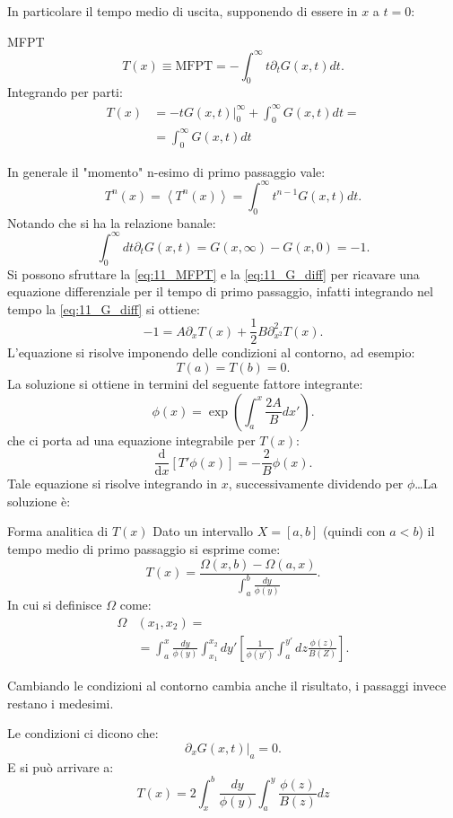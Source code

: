In particolare il tempo medio di uscita, supponendo di essere in $x$  a $t=0$:
\begin{redbox}{MFPT}
\[
    T(x) \equiv \text{MFPT} = - \int_{0}^{\infty} t \partial_{t}G(x,t) dt 
.\]   
Integrando per parti:
\begin{align}
    T(x) &= \left. - t G(x, t) \right|_0^\infty + \int_{0}^{\infty} G(x,t) dt  = \nonumber\\
	 &= \int_{0}^{\infty} G(x,t) dt
    \label{eq:11_MFPT}
\end{align}
\end{redbox}
\noindent
In generale il "momento" n-esimo di primo passaggio vale:
\[
    T^n(x) = \left<T^n(x)\right> = \int_{0}^{\infty} t^{n-1}G(x,t) dt 
.\] 
Notando che si ha la relazione banale:
\[
    \int_{0}^{\infty} dt \partial_{t}G(x,t) = G(x,\infty) -G(x,0) = -1 
.\] 
Si possono sfruttare la \ref{eq:11_MFPT} e la \ref{eq:11_G_diff} per ricavare una equazione differenziale per il tempo di primo passaggio, infatti integrando nel tempo la \ref{eq:11_G_diff} si ottiene:
\[
    -1 = A\partial_xT(x) + \frac{1}{2}B \partial^2_{x^2}T(x) 
.\] 
L'equazione si risolve imponendo delle condizioni al contorno, ad esempio:
\[
    T(a) =T(b) =0
.\] 
La soluzione si ottiene in termini del seguente fattore integrante:
\[
    \phi (x) = \exp\left(\int_{a}^{x} \frac{2A}{B}dx' \right)
.\] 
che ci porta ad una equazione integrabile per $T(x)$:
\[
    \frac{\text{d} }{\text{d} x} \left[T' \phi (x) \right] = - \frac{2}{B}\phi (x) 
.\] 
Tale equazione si risolve integrando in $x$, successivamente dividendo per $\phi$\ldots La soluzione è:
\begin{bluebox}{Forma analitica di $T(x)$}
    Dato un intervallo $X = \left[a, b\right]$ (quindi con $a<b$) il tempo medio di primo passaggio si esprime come:
    \[
	T(x) = \frac{\Omega (x,b) - \Omega (a,x)}{\int_{a}^{b} \frac{dy}{\phi (y) }}
    .\] 
    In cui si definisce $\Omega$ come:
    \[\begin{aligned}
	\Omega &(x_1,x_2) = \\
	       & = \int_{a}^{x} \frac{dy}{\phi (y) }  \int_{x_1}^{x_2} dy'\left[\frac{1}{\phi (y') } \int_{a}^{y'} dz \frac{\phi (z)}{B(Z) } 
\right]    .\end{aligned}\]
\end{bluebox}
\noindent
Cambiando le condizioni al contorno cambia anche il risultato, i passaggi invece restano i medesimi.
\begin{exmp}
    Le condizioni ci dicono che:
    \[
	\left.\partial_{x}G(x,t) \right|_{a}=0
    .\] 
    E si può arrivare a:
    \begin{equation}
	T(x) = 2 \int_{x}^{b} \frac{dy}{\phi (y)} \int_{a}^{y} \frac{\phi (z) }{B(z) }  dz
	\label{eq:11_T_final}
    \end{equation}
\end{exmp}
\noindent
